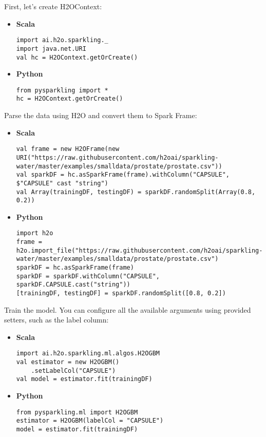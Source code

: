 \documentclass{standalone}
\begin{document}
	First, let's create H2OContext:

	\begin{itemize}
		\item \textbf{Scala} \begin{lstlisting}[style=Scala]
import ai.h2o.sparkling._
import java.net.URI
val hc = H2OContext.getOrCreate()
		\end{lstlisting}
		\item \textbf{Python} \begin{lstlisting}[style=Python]
from pysparkling import *
hc = H2OContext.getOrCreate()
		\end{lstlisting}
	\end{itemize}

	Parse the data using H2O and convert them to Spark Frame:

	\begin{itemize}
		\item \textbf{Scala} \begin{lstlisting}[style=Scala]
val frame = new H2OFrame(new URI("https://raw.githubusercontent.com/h2oai/sparkling-water/master/examples/smalldata/prostate/prostate.csv"))
val sparkDF = hc.asSparkFrame(frame).withColumn("CAPSULE", $"CAPSULE" cast "string")
val Array(trainingDF, testingDF) = sparkDF.randomSplit(Array(0.8, 0.2))
		\end{lstlisting}
		\item \textbf{Python} \begin{lstlisting}[style=Python]
import h2o
frame = h2o.import_file("https://raw.githubusercontent.com/h2oai/sparkling-water/master/examples/smalldata/prostate/prostate.csv")
sparkDF = hc.asSparkFrame(frame)
sparkDF = sparkDF.withColumn("CAPSULE", sparkDF.CAPSULE.cast("string"))
[trainingDF, testingDF] = sparkDF.randomSplit([0.8, 0.2])
		\end{lstlisting}
	\end{itemize}

	Train the model. You can configure all the available arguments using provided setters, such as the label column:

	\begin{itemize}
		\item \textbf{Scala} \begin{lstlisting}[style=Scala]
import ai.h2o.sparkling.ml.algos.H2OGBM
val estimator = new H2OGBM()
	.setLabelCol("CAPSULE")
val model = estimator.fit(trainingDF)
		\end{lstlisting}
		\item \textbf{Python} \begin{lstlisting}[style=Python]
from pysparkling.ml import H2OGBM
estimator = H2OGBM(labelCol = "CAPSULE")
model = estimator.fit(trainingDF)
		\end{lstlisting}
	\end{itemize}
\end{document}
